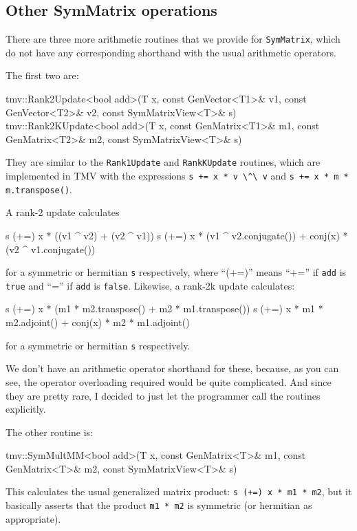 \documentclass[twoside,letterpaper,11pt]{article}
\renewcommand{\tt}[1]{{\lstinline {#1}}}
\begin{document}
\subsection{Other SymMatrix operations}

There are three more arithmetic routines that we provide for \tt{SymMatrix},
which do not have
any corresponding shorthand with the usual arithmetic operators.

The first two are:
\begin{tmvcode}
tmv::Rank2Update<bool add>(T x, const GenVector<T1>& v1, 
      const GenVector<T2>& v2, const SymMatrixView<T>& s)
tmv::Rank2KUpdate<bool add>(T x, const GenMatrix<T1>& m1, 
      const GenMatrix<T2>& m2, const SymMatrixView<T>& s)
\end{tmvcode}
They are similar to the \tt{Rank1Update} and \tt{RankKUpdate} routines,
which are implemented in TMV with the expressions 
\tt{s += x * v \^\ v} and \tt{s += x * m * m.transpose()}.

A rank-2 update calculates
\begin{tmvcode}
s (+=) x * ((v1 ^ v2) + (v2 ^ v1))
s (+=) x * (v1 ^ v2.conjugate()) + conj(x) * (v2 ^ v1.conjugate())
\end{tmvcode}
for a symmetric or hermitian \tt{s} respectively,
where ``(+=)'' means ``+='' if \tt{add} is \tt{true} and ``='' 
if \tt{add} is \tt{false}.
Likewise, a rank-2k update calculates:
\begin{tmvcode}
s (+=) x * (m1 * m2.transpose() + m2 * m1.transpose())
s (+=) x * m1 * m2.adjoint() + conj(x) * m2 * m1.adjoint()
\end{tmvcode}
for a symmetric or hermitian \tt{s} respectively.

We don't have an arithmetic operator 
shorthand for these, because, as you can see, the operator
overloading required would be quite complicated.  
And since they are pretty rare, I decided to just let the programmer 
call the routines explicitly.

The other routine is:
\begin{tmvcode}
tmv::SymMultMM<bool add>(T x, const GenMatrix<T>& m1, 
      const GenMatrix<T>& m2, const SymMatrixView<T>& s)
\end{tmvcode}
This calculates the usual generalized matrix product:
\tt{s (+=) x * m1 * m2}, but it basically
asserts that the product \tt{m1 * m2} is symmetric (or hermitian as appropriate).
\end{document}
